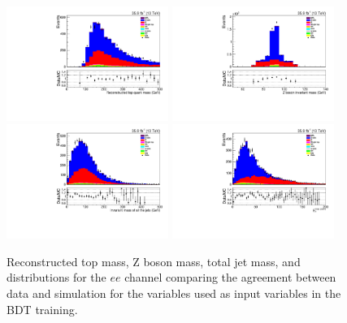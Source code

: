 \begin{figure}[!Htb]
\centering
\includegraphics[width=0.47\textwidth]{figs/background-estimation/plots/unblinded/prompt_ee_ttbarInc/topMass_NPL_ee_wMass_ee.pdf}
\includegraphics[width=0.47\textwidth]{figs/background-estimation/plots/unblinded/prompt_ee_ttbarInc/zPairMass_NPL_ee_wMass_ee.pdf}
\\
\includegraphics[width=0.47\textwidth]{figs/background-estimation/plots/unblinded/prompt_ee_ttbarInc/totalJetMass_NPL_ee_wMass_ee.pdf}
\includegraphics[width=0.47\textwidth]{figs/background-estimation/plots/unblinded/prompt_ee_ttbarInc/met_NPL_ee_wMass_ee.pdf}
\caption{
Reconstructed top mass, Z boson mass, total jet mass, and \MET distributions for the $ee$ channel comparing the agreement between data and simulation for the variables used as input variables in the BDT training.}
\label{fig:inputFeaturesDataSimAgreement1}
\end{figure}

